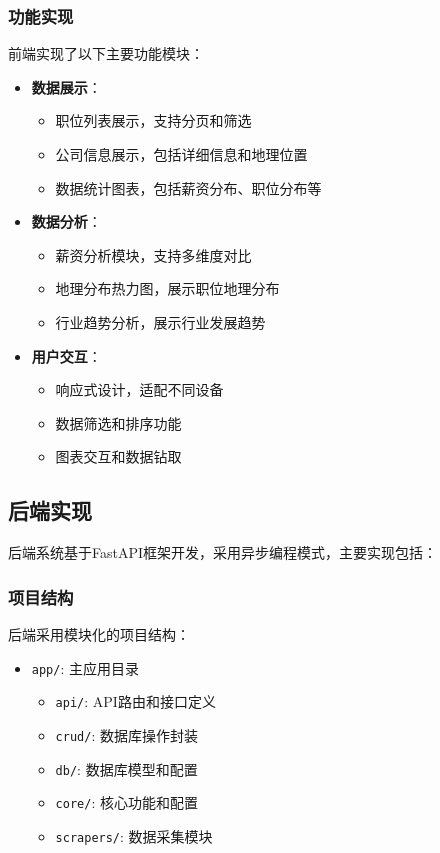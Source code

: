 \subsubsection{功能实现}
前端实现了以下主要功能模块：
\begin{itemize}
    \item \textbf{数据展示}：
    \begin{itemize}
        \item 职位列表展示，支持分页和筛选
        \item 公司信息展示，包括详细信息和地理位置
        \item 数据统计图表，包括薪资分布、职位分布等
    \end{itemize}
    
    \item \textbf{数据分析}：
    \begin{itemize}
        \item 薪资分析模块，支持多维度对比
        \item 地理分布热力图，展示职位地理分布
        \item 行业趋势分析，展示行业发展趋势
    \end{itemize}
    
    \item \textbf{用户交互}：
    \begin{itemize}
        \item 响应式设计，适配不同设备
        \item 数据筛选和排序功能
        \item 图表交互和数据钻取
    \end{itemize}
\end{itemize}

\subsection{后端实现}

后端系统基于FastAPI框架开发，采用异步编程模式，主要实现包括：

\subsubsection{项目结构}
后端采用模块化的项目结构：
\begin{itemize}
    \item \texttt{app/}: 主应用目录
    \begin{itemize}
        \item \texttt{api/}: API路由和接口定义
        \item \texttt{crud/}: 数据库操作封装
        \item \texttt{db/}: 数据库模型和配置
        \item \texttt{core/}: 核心功能和配置
        \item \texttt{scrapers/}: 数据采集模块
    \end{itemize}
\end{itemize}

